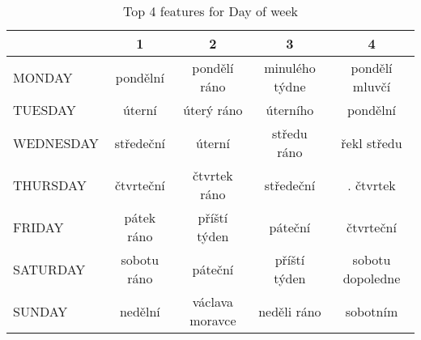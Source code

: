 \begin{table}
\centering
\caption{Top 4 features for Day of week}
\label{tab:top4_day_of_week}
\begin{tabular}{lcccc}
\toprule
{} &            1 &                2 &               3 &                 4 \\
\midrule
MONDAY    &     pondělní &     pondělí ráno &  minulého týdne &    pondělí mluvčí \\
TUESDAY   &       úterní &       úterý ráno &        úterního &          pondělní \\
WEDNESDAY &    středeční &           úterní &     středu ráno &       řekl středu \\
THURSDAY  &    čtvrteční &     čtvrtek ráno &       středeční &         . čtvrtek \\
FRIDAY    &   pátek ráno &     příští týden &         páteční &         čtvrteční \\
SATURDAY  &  sobotu ráno &          páteční &    příští týden &  sobotu dopoledne \\
SUNDAY    &      nedělní &  václava moravce &     neděli ráno &          sobotním \\
\bottomrule
\end{tabular}
\end{table}
